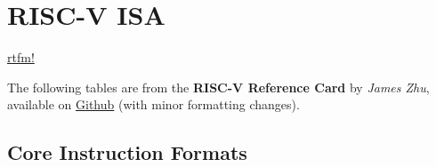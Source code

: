\section{RISC-V ISA}
\href{https://riscv.org/wp-content/uploads/2017/05/riscv-spec-v2.2.pdf}{rtfm!}

The following tables are from the \textbf{RISC-V Reference Card} by \textit{James Zhu}, available on \href{https://github.com/jameslzhu/riscv-card}{Github} (with minor formatting changes).

\newcommand{\instbit}[1]{\mbox{\scriptsize #1}}
\newcommand{\instbitrange}[2]{~\instbit{#1} \hfill \instbit{#2}~}

\subsection{Core Instruction Formats}
\small
